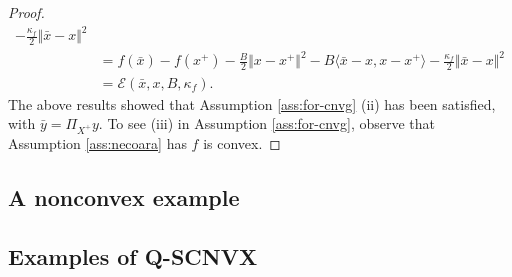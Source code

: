 \documentclass[12pt]{article}
\begin{document}
\begin{proof}
\begin{align*}
            - \frac{\kappa_f}{2}\Vert \bar x - x\Vert^2
            \\
            &= 
            f(\bar x) - f(x^+) 
            - \frac{B}{2}\Vert x - x^+\Vert^2 
            - B\langle \bar x - x, x - x^+\rangle
            - \frac{\kappa_f}{2}\Vert \bar x - x\Vert^2
            \\
            &= \mathcal E(\bar x, x, B, \kappa_f). 
        \end{align*}
        The above results showed that Assumption \ref{ass:for-cnvg} (ii) has been satisfied, with $\bar y = \Pi_{X^+}y$. 
        To see (iii) in Assumption \ref{ass:for-cnvg}, observe that Assumption \ref{ass:necoara} has $f$ is convex. 
    \end{proof}
    \subsection{A nonconvex example}

    \subsection{Examples of Q-SCNVX}






\end{document}
